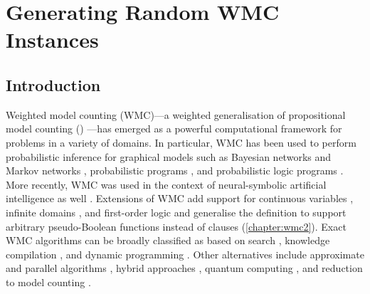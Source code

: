 \chapter{Generating Random WMC Instances}\label{chapter:comparison}

\section{Introduction}

Weighted model counting (WMC)---a weighted generalisation of propositional model
counting (\mc{}) \citep{DBLP:journals/ai/ChaviraD08}---has emerged as a powerful
computational framework for problems in a variety of domains. In particular, WMC
has been used to perform probabilistic inference for graphical models such as
Bayesian networks and Markov networks
\citep{DBLP:conf/ecai/BartKLM16,DBLP:conf/ijcai/ChaviraD05,DBLP:conf/sat/ChaviraD06,DBLP:conf/kr/Darwiche02,DBLP:conf/aaai/SangBK05},
probabilistic programs \citep{DBLP:journals/pacmpl/HoltzenBM20}, and
probabilistic logic programs \citep{DBLP:journals/tplp/FierensBRSGTJR15}. More
recently, WMC was used in the context of neural-symbolic artificial intelligence
as well \citep{DBLP:conf/icml/XuZFLB18}. Extensions of WMC add support for
continuous variables \citep{DBLP:conf/ijcai/BellePB15}, infinite domains
\citep{DBLP:conf/aaai/Belle17}, and first-order logic
\citep{DBLP:conf/ijcai/BroeckTMDR11,DBLP:journals/cacm/GogateD16} and generalise
the definition to support arbitrary pseudo-Boolean functions instead of clauses
(\cref{chapter:wmc2}). Exact WMC algorithms can be broadly classified as based
on search \citep{DBLP:conf/sat/SangBBKP04,DBLP:conf/ijcai/SharmaRSM19},
knowledge compilation
\citep{DBLP:conf/ecai/Darwiche04,DBLP:conf/ijcai/LagniezM17,DBLP:conf/ijcai/OztokD15},
and dynamic programming \citep{DBLP:conf/aaai/DudekPV20,DBLP:conf/cp/DudekPV20}.
Other alternatives include approximate \citep{DBLP:conf/aaai/RenkensKBR14} and
parallel algorithms \citep{DBLP:conf/pgm/DalLL18,DBLP:conf/esa/FichteHWZ18},
hybrid approaches \citep{DBLP:conf/sat/HecherTW20}, quantum computing
\citep{DBLP:conf/ecai/Riguzzi20}, and reduction to model counting
\citep{DBLP:conf/ijcai/ChakrabortyFMV15}.

